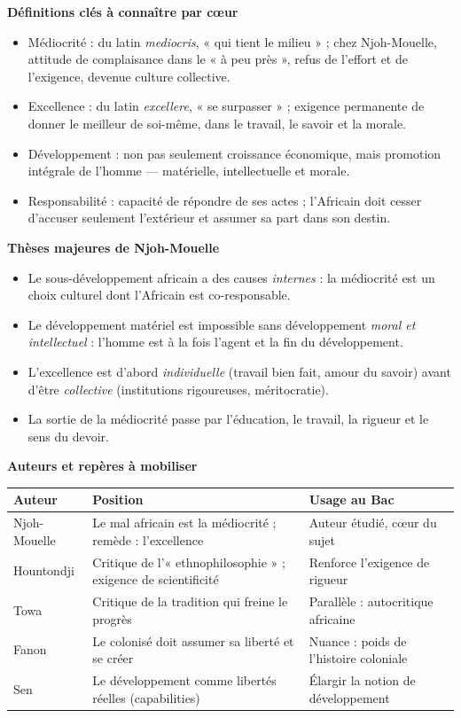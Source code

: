 \documentclass[11pt]{article}
\newcommand{\cle}[1]{{\popxbold\color{popdark}#1}}
\begin{document}
\begin{bilan}
\textbf{Définitions clés à connaître par cœur}
\begin{itemize}
  \item \cle{Médiocrité} : du latin \emph{mediocris}, « qui tient le milieu » ; chez Njoh-Mouelle, attitude de complaisance dans le « à peu près », refus de l'effort et de l'exigence, devenue culture collective.
  \item \cle{Excellence} : du latin \emph{excellere}, « se surpasser » ; exigence permanente de donner le meilleur de soi-même, dans le travail, le savoir et la morale.
  \item \cle{Développement} : non pas seulement croissance économique, mais promotion intégrale de l'homme — matérielle, intellectuelle et morale.
  \item \cle{Responsabilité} : capacité de répondre de ses actes ; l'Africain doit cesser d'accuser seulement l'extérieur et assumer sa part dans son destin.
\end{itemize}

\textbf{Thèses majeures de Njoh-Mouelle}
\begin{itemize}
  \item Le sous-développement africain a des causes \emph{internes} : la médiocrité est un choix culturel dont l'Africain est co-responsable.
  \item Le développement matériel est impossible sans développement \emph{moral et intellectuel} : l'homme est à la fois l'agent et la fin du développement.
  \item L'excellence est d'abord \emph{individuelle} (travail bien fait, amour du savoir) avant d'être \emph{collective} (institutions rigoureuses, méritocratie).
  \item La sortie de la médiocrité passe par l'éducation, le travail, la rigueur et le sens du devoir.
\end{itemize}

\textbf{Auteurs et repères à mobiliser}
\begin{center}
\begin{tabularx}{\linewidth}{|l|X|X|}
\hline
\rowcolor{popblueL} \textbf{Auteur} & \textbf{Position} & \textbf{Usage au Bac} \\
\hline
Njoh-Mouelle & Le mal africain est la médiocrité ; remède : l'excellence & Auteur étudié, cœur du sujet \\
\hline
Hountondji & Critique de l'« ethnophilosophie » ; exigence de scientificité & Renforce l'exigence de rigueur \\
\hline
Towa & Critique de la tradition qui freine le progrès & Parallèle : autocritique africaine \\
\hline
Fanon & Le colonisé doit assumer sa liberté et se créer & Nuance : poids de l'histoire coloniale \\
\hline
Sen & Le développement comme libertés réelles (capabilities) & Élargir la notion de développement \\
\hline
\end{tabularx}
\end{center}


\end{bilan}
\end{document}
